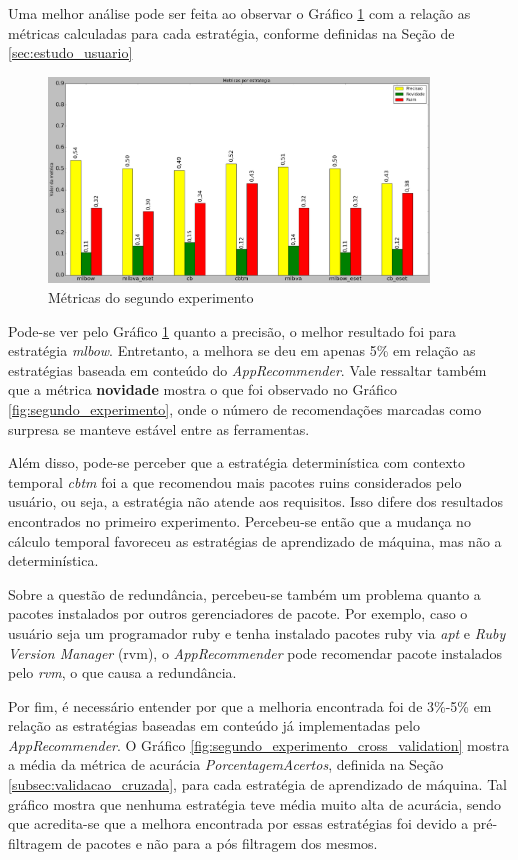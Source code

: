 Uma melhor análise pode ser feita ao observar o Gráfico
\ref{fig:metricas_segundo_experimento} com a relação as métricas calculadas para cada
estratégia, conforme definidas na Seção de \ref{sec:estudo_usuario}

\begin{figure}[h]
  \centering
  \includegraphics[width=0.9\textwidth]{figuras/metricas_segundo_experimento.eps}
  \caption{Métricas do segundo experimento}
  \label{fig:metricas_segundo_experimento}
\end{figure}

Pode-se ver pelo Gráfico \ref{fig:metricas_segundo_experimento} quanto a
precisão, o melhor resultado foi para estratégia \textit{mlbow}. Entretanto, a
melhora se deu em apenas 5\% em relação as estratégias baseada em conteúdo do
\textit{AppRecommender}. Vale ressaltar também que a métrica \textbf{novidade}
mostra o que foi observado no Gráfico \ref{fig:segundo_experimento}, onde o
número de recomendações marcadas como surpresa se manteve estável entre as
ferramentas.

Além disso, pode-se perceber que a estratégia determinística com contexto
temporal \textit{cbtm} foi a que recomendou mais pacotes ruins considerados pelo
usuário, ou seja, a estratégia não atende aos requisitos. Isso difere dos
resultados encontrados no primeiro experimento. Percebeu-se então que a mudança
no cálculo temporal favoreceu as estratégias de aprendizado de máquina, mas não
a determinística.

Sobre a questão de redundância, percebeu-se também um problema quanto a pacotes
instalados por outros gerenciadores de pacote. Por exemplo, caso o usuário seja
um programador ruby e tenha instalado pacotes ruby via \textit{apt} e
\textit{Ruby Version Manager} (rvm), o \textit{AppRecommender} pode recomendar
pacote instalados pelo \textit{rvm}, o que causa a redundância.

Por fim, é necessário entender por que a melhoria encontrada foi de 3\%-5\% em
relação as estratégias baseadas em conteúdo já implementadas pelo
\textit{AppRecommender}. O Gráfico \ref{fig:segundo_experimento_cross_validation}
mostra a média da métrica de acurácia \textit{PorcentagemAcertos}, definida na Seção
\ref{subsec:validacao_cruzada}, para cada estratégia de aprendizado de máquina.
Tal gráfico mostra que nenhuma estratégia teve média muito alta de acurácia, sendo
que acredita-se que a melhora encontrada por essas estratégias foi devido a
pré-filtragem de pacotes e não para a pós filtragem dos mesmos.

